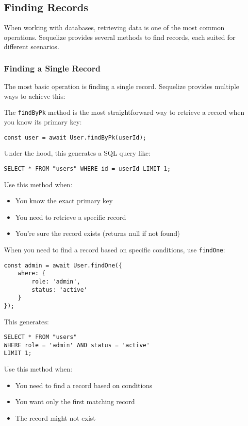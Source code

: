 \documentclass[12pt,a4paper]{book}
\begin{document}
	\subsection{Finding Records}
	When working with databases, retrieving data is one of the most common operations. Sequelize provides several methods to find records, each suited for different scenarios.
	
	\subsubsection{Finding a Single Record}
	The most basic operation is finding a single record. Sequelize provides multiple ways to achieve this:
	
	\begin{tcolorbox}[title=Finding by Primary Key]
		The \texttt{findByPk} method is the most straightforward way to retrieve a record when you know its primary key:
		
		\begin{verbatim}
const user = await User.findByPk(userId);
		\end{verbatim}
		
		Under the hood, this generates a SQL query like:
		\begin{verbatim}
SELECT * FROM "users" WHERE id = userId LIMIT 1;
		\end{verbatim}
		
		Use this method when:
		\begin{itemize}
			\item You know the exact primary key
			\item You need to retrieve a specific record
			\item You're sure the record exists (returns null if not found)
		\end{itemize}
	\end{tcolorbox}
	
	\begin{tcolorbox}[title=Finding One Record with Conditions]
		When you need to find a record based on specific conditions, use \texttt{findOne}:
		
		\begin{verbatim}
const admin = await User.findOne({
	where: {
		role: 'admin',
		status: 'active'
	}
});
		\end{verbatim}
		
		This generates:
		\begin{verbatim}
SELECT * FROM "users" 
WHERE role = 'admin' AND status = 'active' 
LIMIT 1;
		\end{verbatim}
		
		Use this method when:
		\begin{itemize}
			\item You need to find a record based on conditions
			\item You want only the first matching record
			\item The record might not exist
		\end{itemize}
	\end{tcolorbox}
	
\end{document}

